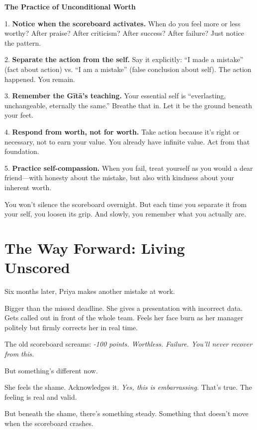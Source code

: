 \documentclass[11pt,twoside]{book}
\begin{document}
\begin{practicebox}
\textbf{The Practice of Unconditional Worth}

1. \textbf{Notice when the scoreboard activates.} When do you feel more or less worthy? After praise? After criticism? After success? After failure? Just notice the pattern.

2. \textbf{Separate the action from the self.} Say it explicitly: ``I made a mistake'' (fact about action) vs. ``I am a mistake'' (false conclusion about self). The action happened. You remain.

3. \textbf{Remember the Gītā's teaching.} Your essential self is ``everlasting, unchangeable, eternally the same.'' Breathe that in. Let it be the ground beneath your feet.

4. \textbf{Respond from worth, not for worth.} Take action because it's right or necessary, not to earn your value. You already have infinite value. Act from that foundation.

5. \textbf{Practice self-compassion.} When you fail, treat yourself as you would a dear friend—with honesty about the mistake, but also with kindness about your inherent worth.

You won't silence the scoreboard overnight. But each time you separate it from your self, you loosen its grip. And slowly, you remember what you actually are.
\end{practicebox}

\section*{The Way Forward: Living Unscored}

Six months later, Priya makes another mistake at work.

Bigger than the missed deadline. She gives a presentation with incorrect data. Gets called out in front of the whole team. Feels her face burn as her manager politely but firmly corrects her in real time.

The old scoreboard screams: \emph{-100 points. Worthless. Failure. You'll never recover from this.}

But something's different now.

She feels the shame. Acknowledges it. \emph{Yes, this is embarrassing.} That's true. The feeling is real and valid.

But beneath the shame, there's something steady. Something that doesn't move when the scoreboard crashes.
\end{document}
